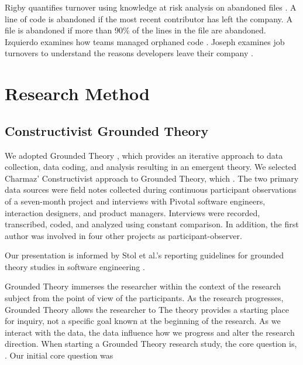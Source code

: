Rigby quantifies turnover using knowledge at risk analysis on abandoned files  \cite{Rigby2016Turnover}. A line of code is abandoned if the most recent contributor has left the company.  A file is abandoned if more than 90\% of the lines in the file are abandoned.  Izquierdo examines how teams managed orphaned code \cite{Izquierdo2009Turnover}. Joseph examines job turnovers to understand the reasons developers leave their company  \cite{Joseph2007Turnover}.  
\section{Research Method}
\label{ResearchMethod}
\subsection{Constructivist Grounded Theory}

We adopted Grounded Theory \cite{Charmaz}, which provides an iterative approach to data collection, data coding, and analysis resulting in an emergent theory. We selected Charmaz' Constructivist approach to Grounded Theory, which  \cite{StolGroundedTheory}. The two primary data sources were field notes collected during continuous participant observations of a seven-month project and interviews with Pivotal software engineers, interaction designers, and product managers. Interviews were recorded, transcribed, coded, and analyzed using constant comparison. In addition, the first author was involved in four other projects as participant-observer.

Our presentation is informed by Stol et al.’s reporting guidelines for grounded theory studies in software engineering \cite{StolGroundedTheory}. 

Grounded Theory immerses the researcher within the context of the research subject from the point of view of the participants. As the research progresses, Grounded Theory allows the researcher to  The theory provides a starting place for inquiry, not a specific goal known at the beginning of the research. As we interact with the data, the data influence how we progress and alter the research direction. When starting a Grounded Theory research study, the core question is,  \cite{GlaserTheoreticalSensitivity}. Our initial core question was 
